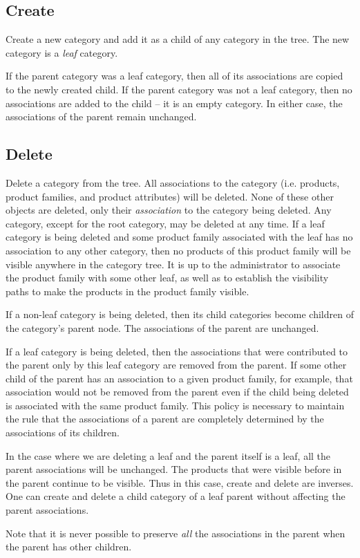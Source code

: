 \documentclass[letterpaper, 12pt]{article}
\begin{document}
\subsection{Create}
Create a new category and add it as a child of any category in the tree.  The new category is a {\em leaf} category.
\par
If the parent category was a leaf category, then all of its associations are copied to the newly created child.  If the parent category was not a leaf category, then no associations are added to the child -- it is an empty category.   In either case, the associations of the parent remain unchanged.

\subsection{Delete}
Delete a category from the tree. All associations to the category (i.e. products, product families, and product attributes) will be deleted.  None of these other objects are deleted, only their {\em association} to the category being deleted.  Any category, except for the root category, may be deleted at any time.  If a leaf category is being deleted and some product family associated with the leaf has no association to any other category, then no products of this product family will be visible anywhere in the category tree.  It is up to the administrator to associate the product family with some other leaf, as well as to establish the visibility paths to make the products in the product family visible.
\par
 If a non-leaf category is being deleted, then its child categories become children of the category's parent node.  The associations of the parent are unchanged.
\par
If a leaf category is being deleted, then the associations that were contributed to the parent only by this leaf category are removed from the parent.  If some other child of the parent has an association to a given product family, for example, that association would not be removed from the parent even if the child being deleted is associated with the same product family.  This policy is necessary to maintain the rule that the associations of a parent are completely determined by the associations of its children.
\par
In the case where we are deleting a leaf and the parent itself is a leaf, all the parent associations will be unchanged.  The products that were visible before in the parent continue to be visible.  Thus in this case, create and delete are inverses.  One can create and delete a child category of a leaf parent without affecting the parent associations.
\par
Note that it is never possible to preserve {\em all} the associations in the parent when the parent has other children.
\end{document}
